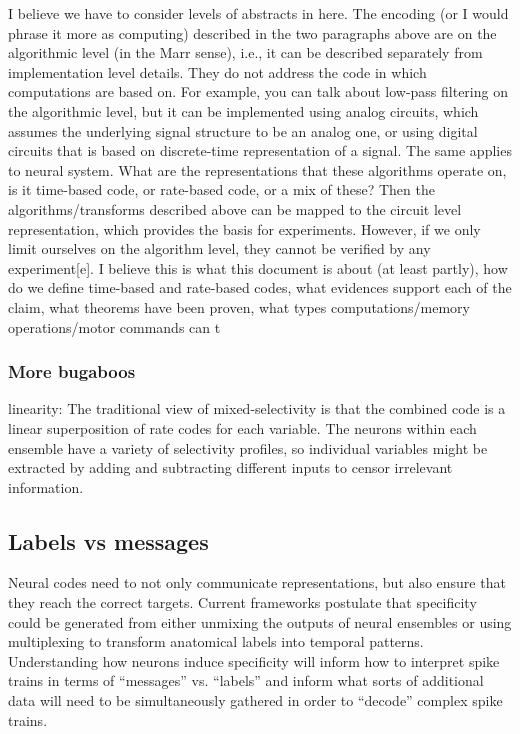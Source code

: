 \documentclass[12pt]{article}
\begin{document}
I believe we have to consider levels of abstracts in here. The encoding (or I would phrase it more as computing) described in the two paragraphs above are on the algorithmic
level (in the Marr sense), i.e., it can be described separately from implementation level details. They do not address the code in which computations are based on. For
example, you can talk about low-pass filtering on the algorithmic level, but it can be implemented using analog circuits, which assumes the underlying signal structure to be
an analog one, or using digital circuits that is based on discrete-time representation of a signal. The same applies to neural system. What are the representations that these
algorithms operate on, is it time-based code, or rate-based code, or a mix of these? Then the algorithms/transforms described above can be mapped to the circuit level
representation, which provides the basis for experiments. However, if we only limit ourselves on the algorithm level, they cannot be verified by any experiment[e]. I believe
this is what this document is about (at least partly), how do we define time-based and rate-based codes, what evidences support each of the claim, what theorems have been
proven, what types computations/memory operations/motor commands can t

\subsubsection{More bugaboos}

linearity: The traditional view of mixed-selectivity is that the combined code is a linear superposition of rate codes for each variable. The neurons within each ensemble have a variety
of selectivity profiles, so individual variables might be extracted by adding and subtracting different inputs to censor irrelevant information.

\subsection{Labels vs messages}

Neural codes need to not only communicate representations, but also ensure that they reach the correct targets. Current frameworks postulate that specificity could
be generated from either unmixing the outputs of neural ensembles or using multiplexing to transform anatomical labels into temporal patterns. Understanding how neurons induce
specificity will inform how to interpret spike trains in terms of “messages” vs. “labels” and inform what sorts of additional data will need to be simultaneously gathered in
order to “decode” complex spike trains.
\end{document}
